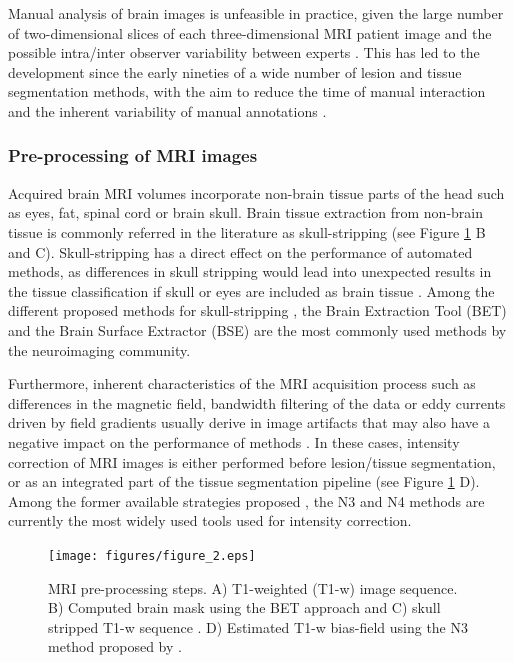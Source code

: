 Manual analysis of brain images is unfeasible in practice, given the large number of two-dimensional slices of each three-dimensional MRI patient image and the possible intra/inter observer variability between experts \cite{Cabezas2011}. This has led to the development since the early nineties of a wide number of lesion and tissue segmentation methods, with the aim to reduce the time of manual interaction and the inherent variability of manual annotations \cite{Cline1990, Gerig1992, Kapur1996}. 


\subsubsection{Pre-processing of MRI images}
Acquired brain MRI volumes incorporate non-brain tissue parts of the head such as eyes, fat, spinal cord or brain skull. Brain tissue extraction from non-brain tissue is commonly referred in the literature as skull-stripping (see Figure \ref{preprocessing_mri} B and C). Skull-stripping has a direct effect on the performance of automated methods, as differences in skull stripping would lead into unexpected results in the tissue classification if skull or eyes are included as brain tissue \cite{Acosta-Cabronero2008, Popescu2012}. Among the different proposed methods for skull-stripping \cite{Acosta-Cabronero2008, Lee2003, Roura2014}, the Brain Extraction Tool (BET) \cite{Smith2002} and the Brain Surface Extractor (BSE) \cite{Shattuck2001} are the most commonly used methods by the neuroimaging community.

Furthermore, inherent characteristics of the MRI acquisition process such as differences in the magnetic field, bandwidth filtering of the data or eddy currents driven by field gradients usually derive in image artifacts that may also have a negative impact on the performance of methods \cite{Simmons1994}. In these cases, intensity correction of MRI images is either performed before lesion/tissue segmentation, or as an integrated part of the tissue segmentation pipeline  (see Figure \ref{preprocessing_mri} D). Among the former available strategies proposed \cite{Arnold2001,Hou2006}, the N3 \cite{Sled1998} and N4 \cite{Tustison2010} methods are currently the most widely used tools used for intensity correction. 


\begin{figure}[top]
  \begin{center}
    \texttt{[image: figures/figure\_2.eps]}
  \end{center}
    \caption{MRI pre-processing steps. A) T1-weighted (T1-w) image sequence. B) Computed brain mask using the BET approach \cite{Smith2002} and C) skull stripped T1-w sequence  . D) Estimated T1-w bias-field using the N3 method proposed by \cite{Sled1998}.}
    \label{preprocessing_mri}
\end{figure}

